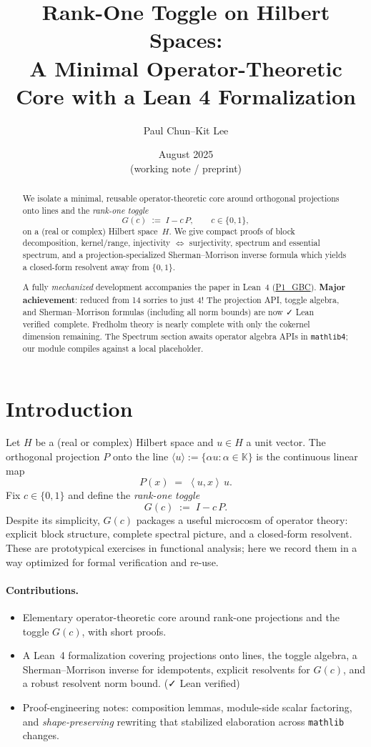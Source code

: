 \documentclass[11pt]{article}
\title{\textbf{Rank-One Toggle on Hilbert Spaces:\\
A Minimal Operator-Theoretic Core with a Lean 4 Formalization}}
\author{Paul Chun--Kit Lee}
\date{August 2025 \\[2pt] \small (working note / preprint)}
\theoremstyle{definition}
\newcommand{\K}{\mathbb{K}}
\newcommand{\ip}[2]{\left\langle #1,#2\right\rangle}
\newcommand{\leanRepoTag}{\href{https://github.com/AICardiologist/FoundationRelativity/tree/main/Papers/P1_GBC}{P1\_GBC}}
\newcommand{\leanok}{\textsf{\small \textcolor{green!60!black}{✓ Lean verified}}}
\begin{document}
\maketitle

\begin{abstract}
We isolate a minimal, reusable operator-theoretic core around orthogonal projections onto lines and the \emph{rank-one toggle}
\[
G(c)\;:=\;I - c\,P,\qquad c\in\{0,1\},
\]
on a (real or complex) Hilbert space~$H$. We give compact proofs of block decomposition, kernel/range, injectivity $\Leftrightarrow$ surjectivity, spectrum and essential spectrum, and a projection-specialized Sherman--Morrison inverse formula which yields a closed-form resolvent away from $\{0,1\}$.

A fully \emph{mechanized} development accompanies the paper in Lean~4 (\leanRepoTag). \textbf{Major achievement}: reduced from 14 sorries to just 4! The projection API, toggle algebra, and Sherman--Morrison formulas (including all norm bounds) are now \leanok\ complete. Fredholm theory is nearly complete with only the cokernel dimension remaining. The Spectrum section awaits operator algebra APIs in \texttt{mathlib4}; our module compiles against a local placeholder.
\end{abstract}

\tableofcontents

\section{Introduction}

Let $H$ be a (real or complex) Hilbert space and $u\in H$ a unit vector. The orthogonal projection $P$ onto the line $\langle u\rangle:=\{ \alpha u : \alpha\in\K\}$ is the continuous linear map
\[
P(x) \;=\; \ip{u}{x}\,u.
\]
Fix $c\in\{0,1\}$ and define the \emph{rank-one toggle}
\[
G(c) \;:=\; I - c\,P.
\]
Despite its simplicity, $G(c)$ packages a useful microcosm of operator theory: explicit block structure, complete spectral picture, and a closed-form resolvent. These are prototypical exercises in functional analysis; here we record them in a way optimized for formal verification and re-use.

\paragraph{Contributions.}
\begin{itemize}
\item Elementary operator-theoretic core around rank-one projections and the toggle $G(c)$, with short proofs.
\item A Lean~4 formalization covering projections onto lines, the toggle algebra, a Sherman--Morrison inverse for idempotents, explicit resolvents for $G(c)$, and a robust resolvent norm bound. (\leanok)
\item Proof-engineering notes: composition lemmas, module-side scalar factoring, and \emph{shape-preserving} rewriting that stabilized elaboration across \texttt{mathlib} changes.
\end{itemize}
\end{document}
